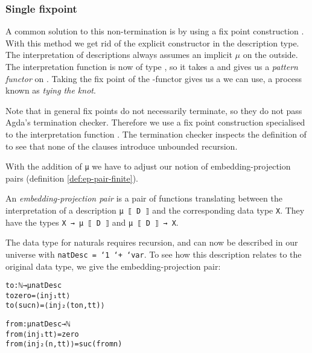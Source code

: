 \subsubsection{Single fixpoint}\label{sec:lit-cft-single}

A common solution to this non-termination is by using a fix point
construction .
With this method we get rid of the explicit  constructor in the
description type.
The interpretation of descriptions always assumes an implicit $μ$ on
the outside.
The interpretation function  is now of type  
  , so it takes a  and gives us a
\emph{pattern functor} on .
Taking the fix point of the -functor gives us a  we can
use, a process known as \emph{tying the knot}.


Note that in general fix points do not necessarily terminate, so they
do not pass Agda's termination checker.
Therefore we use a fix point construction specialised to
the interpretation function .
The termination checker inspects the definition of  to see
that none of the clauses introduce unbounded recursion.

With the addition of \texttt{μ} we have to adjust our notion of
embedding-projection pairs (definition \ref{def:ep-pair-finite}).
\begin{definition}
  An \emph{embedding-projection pair} is a pair of functions
  translating between the interpretation of a description \texttt{μ ⟦
    D ⟧} and the corresponding data type \texttt{X}.
  They have the types \texttt{X → μ ⟦ D ⟧} and \texttt{μ ⟦ D ⟧ → X}.
\end{definition}

\begin{example}
The data type for naturals requires recursion, and can now be
described in our universe with \texttt{natDesc = `1 `+ `var}.
To see how this description relates to the original data type, we give
the embedding-projection pair:

\begin{alltt}
to : ℕ → μ natDesc
to zero = ⟨ inj₁ tt ⟩
to (suc n) = ⟨ inj₂ (to n , tt) ⟩

from : μ natDesc → ℕ
from ⟨ inj₁ tt ⟩ = zero
from ⟨ inj₂ (n , tt) ⟩ = suc (from n)
\end{alltt}
\end{example}

